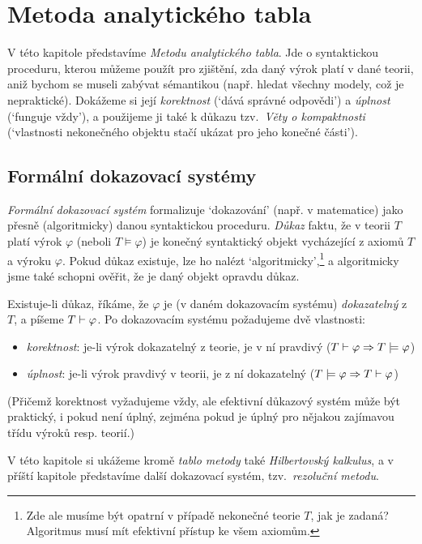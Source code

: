 \chapter{Metoda analytického tabla}
\label{chapter:tableau-method-propositional}

V této kapitole představíme \emph{Metodu analytického tabla}. Jde o syntaktickou proceduru, kterou můžeme použít pro zjištění, zda daný výrok platí v dané teorii, aniž bychom se museli zabývat sémantikou (např. hledat všechny modely, což je nepraktické). Dokážeme si její \emph{korektnost} (`dává správné odpovědi') a \emph{úplnost} (`funguje vždy'), a použijeme ji také k důkazu tzv.\ \emph{Věty o kompaktnosti} (`vlastnosti nekonečného objektu stačí ukázat pro jeho konečné části').

\section{Formální dokazovací systémy}

\emph{Formální dokazovací systém} formalizuje `dokazování' (např. v matematice) jako přesně (algoritmicky) danou syntaktickou proceduru. \emph{Důkaz} faktu, že v teorii $T$ platí výrok $\varphi$ (neboli $T\models\varphi$) je konečný syntaktický objekt vycházející z axiomů $T$ a výroku $\varphi$. Pokud důkaz existuje, lze ho nalézt `algoritmicky',\footnote{Zde ale musíme být opatrní v případě nekonečné teorie $T$, jak je zadaná? Algoritmus musí mít efektivní přístup ke všem axiomům.} a algoritmicky jsme také schopni ověřit, že je daný objekt opravdu důkaz.

Existuje-li důkaz, říkáme, že $\varphi$ je (v daném dokazovacím systému) \emph{dokazatelný} z $T$, a píšeme $T\vdash\varphi$. Po dokazovacím systému požadujeme dvě vlastnosti:
\begin{itemize}
    \item \emph{korektnost}: je-li výrok dokazatelný z teorie, je v ní pravdivý ($T\vdash\varphi\Rightarrow T\models\varphi$)
    \item \emph{úplnost}: je-li výrok pravdivý v teorii, je z ní dokazatelný ($T\models\varphi\Rightarrow T\vdash\varphi$)
\end{itemize}
(Přičemž korektnost vyžadujeme vždy, ale efektivní důkazový systém může být praktický, i pokud není úplný, zejména pokud je úplný pro nějakou zajímavou třídu výroků resp. teorií.)

V této kapitole si ukážeme kromě \emph{tablo metody} také \emph{Hilbertovský kalkulus}, a v příští kapitole představíme další dokazovací systém, tzv.\ \emph{rezoluční metodu}.


